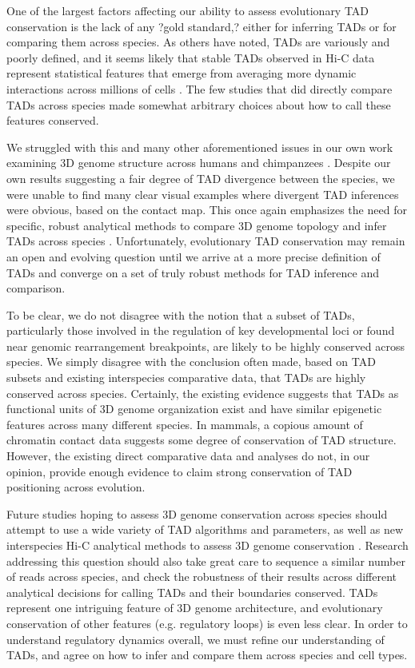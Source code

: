 One of the largest factors affecting our ability to assess evolutionary TAD conservation is the lack of any ?gold standard,? either for inferring TADs or for comparing them across species. As others have noted, TADs are variously and poorly defined, and it seems likely that stable TADs observed in Hi-C data represent statistical features that emerge from averaging more dynamic interactions across millions of cells \cite{Wit.2019}. The few studies that did directly compare TADs across species made somewhat arbitrary choices about how to call these features conserved.

We struggled with this and many other aforementioned issues in our own work examining 3D genome structure across humans and chimpanzees \cite{Eres.2019}. Despite our own results suggesting a fair degree of TAD divergence between the species, we were unable to find many clear visual examples where divergent TAD inferences were obvious, based on the contact map. This once again emphasizes the need for specific, robust analytical methods to compare 3D genome topology and infer TADs across species . Unfortunately, evolutionary TAD conservation may remain an open and evolving question until we arrive at a more precise definition of TADs and converge on a set of truly robust methods for TAD inference and comparison.

To be clear, we do not disagree with the notion that a subset of TADs, particularly those involved in the regulation of key developmental loci or found near genomic rearrangement breakpoints, are likely to be highly conserved across species. We simply disagree with the conclusion often made, based on TAD subsets and existing interspecies comparative data, that TADs are highly conserved across species. Certainly, the existing evidence suggests that TADs as functional units of 3D genome organization exist and have similar epigenetic features across many different species. In mammals, a copious amount of chromatin contact data suggests some degree of conservation of TAD structure. However, the existing direct comparative data and analyses do not, in our opinion, provide enough evidence to claim strong conservation of TAD positioning across evolution.

Future studies hoping to assess 3D genome conservation across species should attempt to use a wide variety of TAD algorithms and parameters, as well as new interspecies Hi-C analytical methods to assess 3D genome conservation \cite{Yang.2019, Nuriddinov.2019}. Research addressing this question should also take great care to sequence a similar number of reads across species, and check the robustness of their results across different analytical decisions for calling TADs and their boundaries conserved. TADs represent one intriguing feature of 3D genome architecture, and evolutionary conservation of other features (e.g. regulatory loops) is even less clear. In order to understand regulatory dynamics overall, we must refine our understanding of TADs, and agree on how to infer and compare them across species and cell types.

